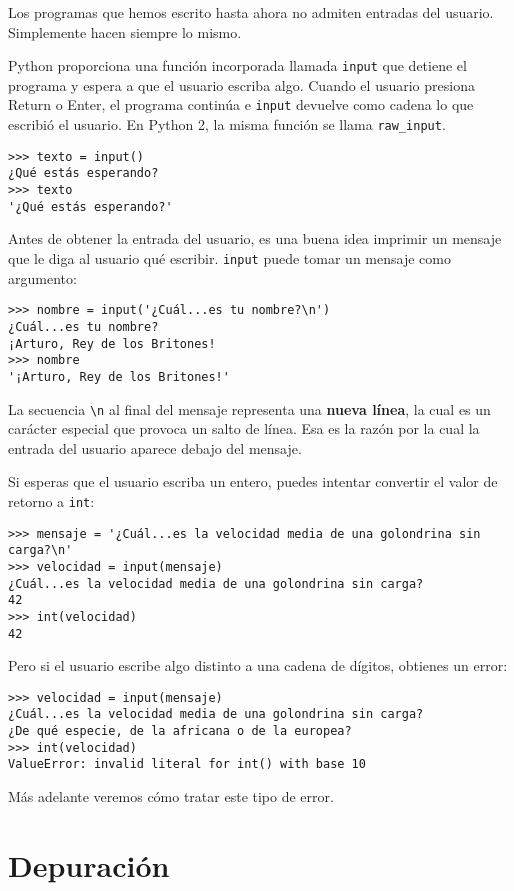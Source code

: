 \documentclass[10pt]{book}
\begin{document}
Los programas que hemos escrito hasta ahora no admiten entradas del usuario.
Simplemente hacen siempre lo mismo.

Python proporciona una función incorporada llamada {\tt input} que
detiene el programa y
espera a que el usuario escriba algo.  Cuando el usuario presiona {\sf
  Return} o {\sf Enter}, el programa continúa e \verb"input"
devuelve como cadena lo que escribió el usuario.  En Python 2, la misma
función se llama \verb"raw_input".

\begin{verbatim}
>>> texto = input()
¿Qué estás esperando?
>>> texto
'¿Qué estás esperando?'
\end{verbatim}
%
Antes de obtener la entrada del usuario, es una buena idea imprimir
un mensaje que le diga al usuario qué escribir.  \verb"input" puede tomar un
mensaje como argumento:

\begin{verbatim}
>>> nombre = input('¿Cuál...es tu nombre?\n')
¿Cuál...es tu nombre?
¡Arturo, Rey de los Britones!
>>> nombre
'¡Arturo, Rey de los Britones!'
\end{verbatim}
%
La secuencia \verb"\n" al final del mensaje representa una {\bf
  nueva línea}, la cual es un carácter especial que provoca un salto de línea.
Esa es la razón por la cual la entrada del usuario aparece debajo del mensaje.  

Si esperas que el usuario escriba un entero, puedes intentar convertir
el valor de retorno a {\tt int}:

\begin{verbatim}
>>> mensaje = '¿Cuál...es la velocidad media de una golondrina sin carga?\n'
>>> velocidad = input(mensaje)
¿Cuál...es la velocidad media de una golondrina sin carga?
42
>>> int(velocidad)
42
\end{verbatim}
%
Pero si el usuario escribe algo distinto a una cadena de dígitos,
obtienes un error:

\begin{verbatim}
>>> velocidad = input(mensaje)
¿Cuál...es la velocidad media de una golondrina sin carga?
¿De qué especie, de la africana o de la europea?
>>> int(velocidad)
ValueError: invalid literal for int() with base 10
\end{verbatim}
%
Más adelante veremos cómo tratar este tipo de error.


\section{Depuración}
\label{whitespace}
\end{document}
